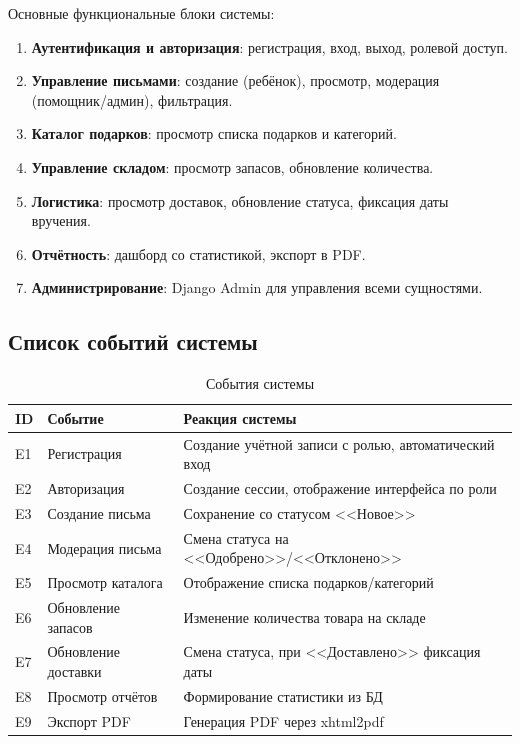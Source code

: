 \documentclass[14pt,a4paper]{extarticle}
\begin{document}
Основные функциональные блоки системы:
\begin{enumerate}
    \item \textbf{Аутентификация и авторизация}: регистрация, вход, выход, ролевой доступ.
    \item \textbf{Управление письмами}: создание (ребёнок), просмотр, модерация (помощник/админ), фильтрация.
    \item \textbf{Каталог подарков}: просмотр списка подарков и категорий.
    \item \textbf{Управление складом}: просмотр запасов, обновление количества.
    \item \textbf{Логистика}: просмотр доставок, обновление статуса, фиксация даты вручения.
    \item \textbf{Отчётность}: дашборд со статистикой, экспорт в PDF.
    \item \textbf{Администрирование}: Django Admin для управления всеми сущностями.
\end{enumerate}

\subsection{Список событий системы}

\begin{table}[H]
\centering
\caption{События системы}
\label{tab:events}
\small
\begin{tabular}{|C{0.7cm}|L{3.5cm}|L{8.5cm}|}
\hline
\textbf{ID} & \textbf{Событие} & \textbf{Реакция системы} \\
\hline
E1 & Регистрация & Создание учётной записи с ролью, автоматический вход \\
\hline
E2 & Авторизация & Создание сессии, отображение интерфейса по роли \\
\hline
E3 & Создание письма & Сохранение со статусом <<Новое>> \\
\hline
E4 & Модерация письма & Смена статуса на <<Одобрено>>/<<Отклонено>> \\
\hline
E5 & Просмотр каталога & Отображение списка подарков/категорий \\
\hline
E6 & Обновление запасов & Изменение количества товара на складе \\
\hline
E7 & Обновление доставки & Смена статуса, при <<Доставлено>> фиксация даты \\
\hline
E8 & Просмотр отчётов & Формирование статистики из БД \\
\hline
E9 & Экспорт PDF & Генерация PDF через xhtml2pdf \\
\hline
\end{tabular}
\end{table}
\end{document}
